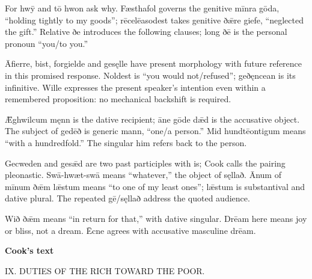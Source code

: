For hwȳ and tō hwon ask why. Fæsthafol governs the genitive mīnra gōda, “holding tightly to my goods”; rēcelēasodest takes genitive ðǣre giefe, “neglected the gift.” Relative ðe introduces the following clauses; long ðē is the personal pronoun “you/\allowbreak{}to you.”

Āfierre, bist, forgielde and gesęlle have present morphology with future reference in this promised response. Noldest is “you would not/\allowbreak{}refused”; geðęncean is its infinitive. Wille expresses the present speaker’s intention even within a remembered proposition: no mechanical backshift is required.

Ǣghwilcum męnn is the dative recipient; āne gōde dǣd is the accusative object. The subject of gedēð is generic mann, “one/\allowbreak{}a person.” Mid hundtēontigum means “with a hundredfold.” The singular him refers back to the person.

Gecweden and gesǣd are two past participles with is; Cook calls the pairing pleonastic. Swā-hwæt-swā means “whatever,” the object of sęllað. Ānum of mīnum ðǣm lǣstum means “to one of my least ones”; lǣstum is substantival and dative plural. The repeated gē/\allowbreak{}sęllað address the quoted audience.

Wið ðǣm means “in return for that,” with dative singular. Drēam here means joy or bliss, not a dream. Ēcne agrees with accusative masculine drēam.

\textbf{Cook’s text}

IX. DUTIES OF THE RICH TOWARD THE POOR.

